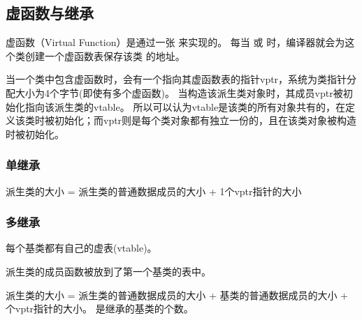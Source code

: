 \documentclass[letterpaper,10pt,english]{sphinxmanual}
\begin{document}
\subsection{虚函数与继承}
\label{\detokenize{cpp/04_classSize:id7}}
虚函数（Virtual Function）是通过一张  来实现的。
每当  或  时，编译器就会为这个类创建一个虚函数表保存该类  的地址。

当一个类中包含虚函数时，会有一个指向其虚函数表的指针vptr，系统为类指针分配大小为4个字节(即使有多个虚函数)。
当构造该派生类对象时，其成员vptr被初始化指向该派生类的vtable。
所以可以认为vtable是该类的所有对象共有的，在定义该类时被初始化；而vptr则是每个类对象都有独立一份的，且在该类对象被构造时被初始化。


\subsubsection{单继承}
\label{\detokenize{cpp/04_classSize:id8}}
派生类的大小 = 派生类的普通数据成员的大小 + 1个vptr指针的大小

%
\begin{sphinxVerbatim}[commandchars=\\\{\},numbers=left,firstnumber=1,stepnumber=1]
 
      
      

   
      
      
\end{sphinxVerbatim}


\subsubsection{多继承}
\label{\detokenize{cpp/04_classSize:id9}}
每个基类都有自己的虚表(vtable)。

派生类的成员函数被放到了第一个基类的表中。

派生类的大小 = 派生类的普通数据成员的大小 + 基类的普通数据成员的大小 +  个vptr指针的大小。  是继承的基类的个数。
\end{document}
